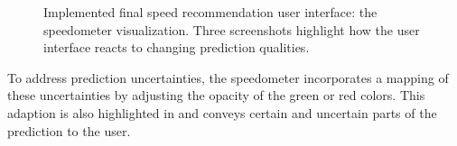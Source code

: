 \begin{figure}[!b]
\centering
{}
\caption{Implemented final speed recommendation user interface: the speedometer visualization. Three screenshots highlight how the user interface reacts to changing prediction qualities.}
\label{fig:speedometer-adaptions}
\end{figure}

To address prediction uncertainties, the speedometer incorporates a mapping of these uncertainties by adjusting the opacity of the green or red colors. This adaption is also highlighted in  and conveys certain and uncertain parts of the prediction to the user. 

